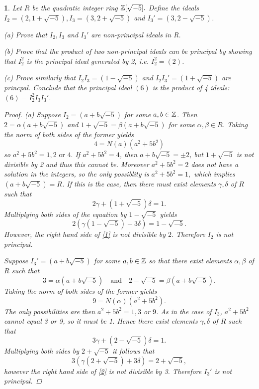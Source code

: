 \documentclass[10pt]{amsart}
\begin{document}
\newtheorem{thm}{}
\begin{thm}
  \label{Ex1}
  Let $R$ be the quadratic integer ring \(\mathbb{Z}[\sqrt{-5}].\)
  Define the ideals \(I_2 = (2, 1 + \sqrt{-5}), I_3 = (3, 2 + \sqrt{-5})\) and \(I_3' = (3, 2 - \sqrt{-5})\).


  (a) Prove that \(I_2, I_3\) and \(I_3'\) are non-principal ideals in R.
  
  (b) Prove that the product of two non-principal ideals can be principal by showing that \(I_2^2\) is the principal ideal generated by 2, i.e. \(I_2^2 = (2)\).

  (c) Prove similarly that \(I_2I_3 = (1  - \sqrt{-5})\) and \(I_2I_3' = (1 + \sqrt{-5})\) are princpal.  
  Conclude that the principal ideal \((6)\) is the product of 4 ideals: \((6) = I_2^2I_3I_3'\).
  \begin{proof}
    (a) Suppose \(I_2 = (a + b \sqrt{-5})\) for some \(a,b \in \mathbb{Z}\).
    Then \(2 = \alpha(a + b\sqrt{-5})\) and \(1 + \sqrt{-5} = \beta(a + b\sqrt{-5})\) for some \(\alpha, \beta \in R\).
    Taking the norm of both sides of the former yields \[4 = N(a)(a^2 + 5b^2)\]
    so \(a^2 + 5b^2 = 1, 2 \text{ or } 4.\)  If \(a^2 + 5b^2 = 4\), then \(a + b\sqrt{-5} = \pm 2\), but \(1 + \sqrt{-5}\) is not divisible by 2 and thus this cannot be.
    Moreover \(a^2 + 5b^2 = 2\) does not have a solution in the integers, so the only possiblity is \(a^2 + 5b^2 = 1,\) which implies \((a + b\sqrt{-5}) = R\).
    If this is the case, then there must exist elements \(\gamma, \delta\) of \(R\) such that \[2\gamma + (1 + \sqrt{-5})\delta = 1.\]
    Multiplying both sides of the equation by $1 - \sqrt{-5}$ yields 
    \begin{equation}
      \label{1}
      2(\gamma(1-\sqrt{-5}) + 3\delta) = 1 - \sqrt{-5}.
    \end{equation}
    However, the right hand side of \eqref{1} is not divisible by \(2\).  
    Therefore \(I_2\) is not principal. 
    
    Suppose \(I_3' = (a + b\sqrt{-5})\) for some \(a,b \in \mathbb{Z}\) so that there exist elements \(\alpha, \beta\) of \(R\) such that \[3 = \alpha(a + b\sqrt{-5}) \quad \text{and} \quad 2 - \sqrt{-5} = \beta(a + b\sqrt{-5}).\]
    Taking the norm of both sides of the former yields \[9 = N(\alpha)(a^2 + 5b^2).\]
    The only possibilities are then \(a^2 + 5b^2 = 1, 3 \) or \(9\).
    As in the case of \(I_3\), \(a^2 + 5b^2\) cannot equal 3 or 9, so it must be 1.
    Hence there exist elements \(\gamma, \delta\) of \(R\) such that \[3\gamma + (2 - \sqrt{-5})\delta = 1.\]
    Multiplying both sides by \(2 + \sqrt{-5}\) it follows that
    \begin{equation}
      \label{2}
      3(\gamma(2+\sqrt{-5}) + 3\delta) = 2 + \sqrt{-5},
    \end{equation}
    however the right hand side of \eqref{2} is not divisible by 3.  Therefore \(I_3'\) is not principal.


\end{proof}
\end{thm}
\end{document}
